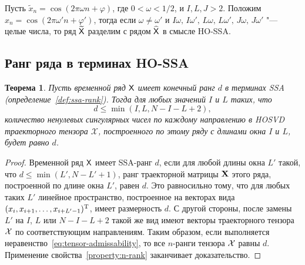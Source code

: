 \documentclass[specialist,
    substylefile = spbu.rtx,
    subf,href,colorlinks=true, 12pt]{disser}
\theoremstyle{plain}
\newtheorem{theorem}{Теорема}
\theoremstyle{definition}
\theoremstyle{remark}
\newtheorem*{remark}{Замечание}
\begin{document}
\begin{itemize}
        Пусть $\tilde{x}_n=\cos(2\pi \omega n + \varphi)$, где $0 < \omega < 1/2$, и $I, L, J > 2$.
        Положим \linebreak $\hat{x}_n=\cos(2\pi \omega' n + \varphi')$,
        тогда если $\omega\ne\omega'$ и $I\omega,\, I\omega',\, L\omega,\, L\omega',\, J\omega,\, J\omega'$
        "--- целые числа, то ряд $\widetilde{\mathsf{X}}$ разделим с рядом $\widehat{\mathsf{X}}$ в смысле HO-SSA.
    \end{itemize}


    \subsection{Ранг ряда в терминах HO-SSA}\label{subsec:tensor-ssa-rank}
    \begin{theorem}
        \label{state:tens-ssa-rank}
        Пусть временной ряд $\mathsf{X}$ имеет конечный ранг $d$ в терминах \emph{SSA} (определение~\ref{def:ssa-rank}).
        Тогда для любых значений $I$ и $L$ таких, что
        \begin{equation}
            d\leqslant\min(I, L, N-I-L+2), \label{eq:tensor-admissability}
        \end{equation}
        количество ненулевых сингулярных чисел по каждому направлению в \emph{HOSVD} траекторного тензора $\mathcal{X}$,
        построенного по этому ряду с длинами окна $I$ и $L$, будет равно $d$.
    \end{theorem}
    \begin{proof}
        Временной ряд $\mathsf{X}$ имеет SSA-ранг $d$, если для любой длины окна $L'$ такой, что
        $d \leqslant \min(L', N-L'+1)$,
        ранг траекторной матрицы $\mathbf{X}$ этого ряда, построенной по длине окна $L'$, равен $d$.
        Это равносильно тому, что для любых таких $L'$ линейное пространство, построенное на векторах вида
        $(x_i, x_{i+1}, \ldots, x_{i + L' - 1})^{\mathrm{T}}$, имеет размерность $d$.
        С другой стороны, после замены $L'$ на $I$, $L$ или $N-I-L+2$ такой же вид имеют векторы траекторного тензора $\mathcal{X}$ по соответствующим направлениям.
        Таким образом, если выполняется неравенство~\eqref{eq:tensor-admissability}, то все $n$-ранги тензора
        $\mathcal{X}$ равны $d$.
        Применение свойства~\ref{property:n-rank} заканчивает доказательство.
    \end{proof}
\end{document}
